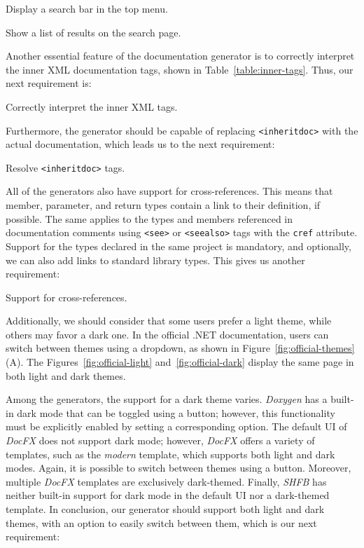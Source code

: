 \begin{subrequirement}
    Display a search bar in the top menu.
    \label{req:search-bar}
\end{subrequirement}

\begin{subrequirement}
    Show a list of results on the search page.
\end{subrequirement}

Another essential feature of the documentation generator is to correctly interpret the inner XML documentation tags, shown in Table~\ref{table:inner-tags}.
Thus, our next requirement is:

\begin{requirement}
    Correctly interpret the inner XML tags.
    \label{req:inner-xml-tags}
\end{requirement}

Furthermore, the generator should be capable of replacing \texttt{<inheritdoc>} with the actual documentation, which leads us to the next requirement:

\begin{requirement}
    Resolve \texttt{<inheritdoc>} tags.
    \label{req:inheritdoc}
\end{requirement}

All of the generators also have support for cross-references.
This means that member, parameter, and return types contain a link to their definition, if possible.
The same applies to the types and members referenced in documentation comments using \texttt{<see>} or \texttt{<seealso>} tags with the \texttt{cref} attribute.
Support for the types declared in the same project is mandatory, and optionally, we can also add links to standard library types.
This gives us another requirement:

\begin{requirement}
    Support for cross-references.
    \label{req:cross-ref}
\end{requirement}

Additionally, we should consider that some users prefer a light theme, while others may favor a dark one.
In the official .NET documentation, users can switch between themes using a dropdown, as shown in Figure~\ref{fig:official-themes} (A).
The Figures~\ref{fig:official-light} and~\ref{fig:official-dark} display the same page in both light and dark themes.

Among the generators, the support for a dark theme varies.
\textit{Doxygen} has a built-in dark mode that can be toggled using a button; however, this functionality must be explicitly enabled by setting a corresponding option.
The default UI of \textit{DocFX} does not support dark mode; however, \textit{DocFX} offers a variety of templates, such as the \textit{modern} template, which supports both light and dark modes. 
Again, it is possible to switch between themes using a button.
Moreover, multiple \textit{DocFX} templates are exclusively dark-themed.
Finally, \textit{SHFB} has neither built-in support for dark mode in the default UI nor a dark-themed template.
In conclusion, our generator should support both light and dark themes, with an option to easily switch between them, which is our next requirement:

